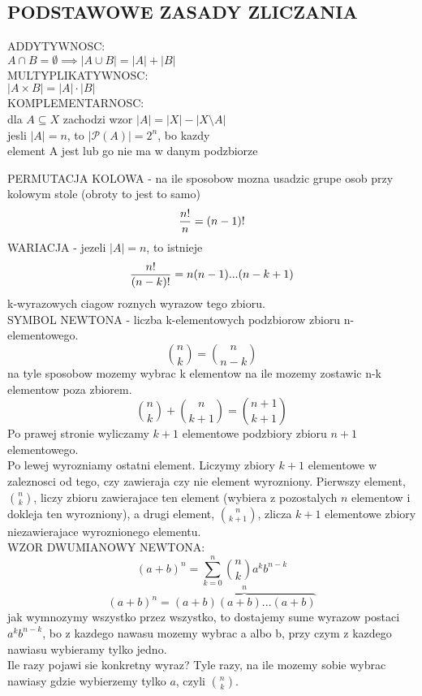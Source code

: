\documentclass{article}
\begin{document}
\subsection*{\color{tit}PODSTAWOWE ZASADY ZLICZANIA}
  \begin{center}
    \color{def}ADDYTYWNOSC: \color{txt} \smallskip\\$A\cap B = \emptyset \implies |A\cup B| = |A|+|B|$\medskip\\
    \color{def}MULTYPLIKATYWNOSC: \color{txt} \smallskip\\$|A\times B| = |A|\cdot|B|$\medskip\\
    \color{def}KOMPLEMENTARNOSC: \color{txt}\smallskip\\dla $A\subseteq X$ zachodzi wzor $|A|=|X|-|X\setminus A|$\bigskip\\
    jesli \color{emp}$|A| = n$, to $|\mathcal{P}(A)| = 2^n$\color{txt}, bo kazdy \\element A jest lub go nie ma w danym podzbiorze\\
  \end{center}
  \color{def}PERMUTACJA KOLOWA \color{txt}- na ile sposobow mozna usadzic grupe osob przy kolowym stole (obroty to jest to samo)
  $$\frac{n!}n=(n-1)!\bigskip$$
  \color{def}WARIACJA \color{txt}- jezeli $|A| = n$, to istnieje
  $${n!\over (n-k)!} = n(n-1)...(n-k+1)$$
  k-wyrazowych ciagow roznych wyrazow tego zbioru\bigskip.\\
  \color{def}SYMBOL NEWTONA \color{txt}- liczba k-elementowych podzbiorow zbioru n-elementowego.
  $${n\choose k} = {n\choose n-k}$$
  na tyle sposobow mozemy wybrac k elementow na ile mozemy zostawic n-k elementow poza zbiorem. 
  $${n\choose k} + {n\choose k+1} = {n+1\choose k+1}$$
  Po prawej stronie wyliczamy $k+1$ elementowe podzbiory zbioru $n+1$ elementowego. \\
  Po lewej wyrozniamy ostatni element. Liczymy zbiory $k+1$ elementowe w zaleznosci od tego, czy zawieraja czy nie element wyrozniony. Pierwszy element, ${n\choose k}$, liczy zbioru zawierajace ten element (wybiera z pozostalych $n$ elementow i dokleja ten wyrozniony), a drugi element, ${n\choose k+1}$, zlicza $k+1$ elementowe zbiory niezawierajace wyroznionego elementu.\bigskip\\
  \color{def}WZOR DWUMIANOWY NEWTONA\color{txt}: 
  $$(a+b)^n=\sum\limits_{k=0}^n{n\choose k}a^kb^{n-k}$$
  $$(a+b)^n=\overbrace{(a+b)(a+b)...(a+b)}^{n}$$
  jak wymnozymy wszystko przez wszystko, to dostajemy sume wyrazow postaci $a^kb^{n-k}$, bo z kazdego nawasu mozemy wybrac a albo b, przy czym z kazdego nawiasu wybieramy tylko jedno. \smallskip\\\color{acc}Ile razy pojawi sie konkretny wyraz? \color{txt}Tyle razy, na ile mozemy sobie wybrac nawiasy gdzie wybierzemy tylko $a$, czyli ${n\choose k}$.\medskip
\end{document}
